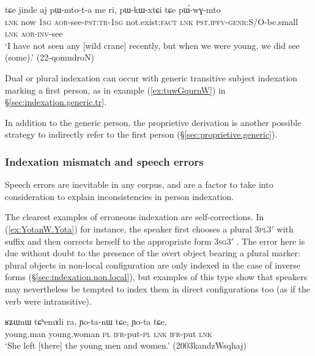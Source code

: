 \begin{exe}
\ex   \label{ex:pWkWxtCi.tCe.pWwGmto}
 \gll tɕe jinde aj pɯ-mto-t-a me ri, pɯ-kɯ-xtɕi tɕe pɯ́-wɣ-mto \\
 \textsc{lnk} now \textsc{1sg} \textsc{aor}-see-\textsc{pst}:\textsc{tr}-\textsc{1sg} not.exist:\textsc{fact} \textsc{lnk} \textsc{pst}.\textsc{ipfv}-\textsc{genr}:S/O-be.small \textsc{lnk} \textsc{aor}-\textsc{inv}-see \\
\glt `I have not seen any [wild crane] recently, but when we were young, we did see (some).' (22-qomndroN) 
\end{exe}

Dual or plural indexation can occur with generic transitive subject indexation marking a first person, as in example (\ref{ex:tuwGqurnW}) in §\ref{sec:indexation.generic.tr}.

In addition to the generic person, the proprietive derivation is another possible strategy to indirectly refer to the first person (§\ref{sec:proprietive.generic}).
 
\subsubsection{Indexation mismatch and speech errors} \label{sec:mismatch.errors}
 
Speech errors are inevitable in any corpus, and are a factor to take into consideration to explain inconsistencies in person indexation. 

The clearest examples of erroneous indexation are self-corrections. In (\ref{ex:YotanW.Yota}) for instance, the speaker first chooses a plural \textsc{3pl}\fl{}3$'$ with  suffix and then corrects herself to the appropriate form \textsc{3sg}\fl{}3$'$ . The error here is due without doubt to the presence of the overt object  bearing a plural marker: plural objects in non-local configuration are only indexed in the case of inverse forms (§\ref{sec:indexation.non.local}), but examples of this type show that speakers may nevertheless be tempted to index them in direct configurations too (as if the verb were intransitive).

\begin{exe}
\ex \label{ex:YotanW.Yota}
\gll  ʁʑɯnɯ tɕʰemɤli ra, ɲo-ta-nɯ tɕe, ɲo-ta tɕe, \\
young.man young.woman \textsc{pl} \textsc{ifr}-put-\textsc{pl} \textsc{lnk} \textsc{ifr}-put \textsc{lnk} \\
\glt `She left [there] the young men and women.' (2003kandzWsqhaj)
\end{exe} 

